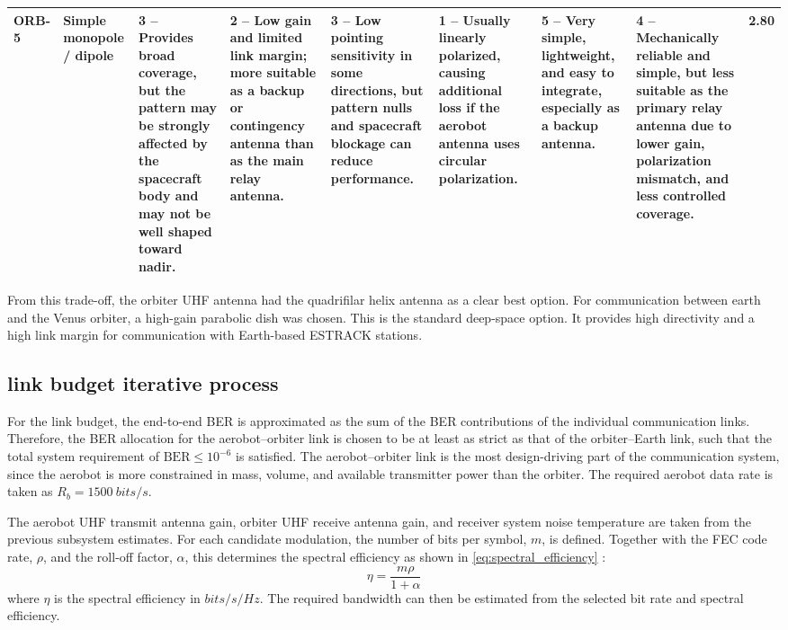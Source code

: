 \begin{table}[H]
{\begin{tabular}{|p{1.2cm}|p{3.0cm}|p{4.0cm}|p{3.5cm}|p{3.8cm}|p{3.7cm}|p{3.5cm}|p{3.8cm}|p{2.0cm}|}
ORB-5 &
\textbf{Simple monopole / dipole} &
\cellcolor{score3!40}\textbf{3} -- Provides broad coverage, but the pattern may be strongly affected by the spacecraft body and may not be well shaped toward nadir. &
\cellcolor{score2!40}\textbf{2} -- Low gain and limited link margin; more suitable as a backup or contingency antenna than as the main relay antenna. &
\cellcolor{score3!40}\textbf{3} -- Low pointing sensitivity in some directions, but pattern nulls and spacecraft blockage can reduce performance. &
\cellcolor{score1!40}\textbf{1} -- Usually linearly polarized, causing additional loss if the aerobot antenna uses circular polarization. &
\cellcolor{score5!40}\textbf{5} -- Very simple, lightweight, and easy to integrate, especially as a backup antenna. &
\cellcolor{score4!40}\textbf{4} -- Mechanically reliable and simple, but less suitable as the primary relay antenna due to lower gain, polarization mismatch, and less controlled coverage. &
\cellcolor{score3!40}\textbf{2.80} \\
\hline

\end{tabular}%
}
\end{table}
From this trade-off, the orbiter UHF antenna had the quadrifilar helix antenna as a clear best option. For communication between earth and the Venus orbiter, a high-gain parabolic dish was chosen. This is the standard deep-space option. It provides high directivity and a high link margin for communication with Earth-based ESTRACK stations.
\subsection{link budget iterative process}
\label{subsec: link budget iterative process}
For the link budget, the end-to-end BER is approximated as the sum of the BER contributions of the individual communication links. Therefore, the BER allocation for the aerobot--orbiter link is chosen to be at least as strict as that of the orbiter--Earth link, such that the total system requirement of $\mathrm{BER} \leq 10^{-6}$ is satisfied. The aerobot--orbiter link is the most design-driving part of the communication system, since the aerobot is more constrained in mass, volume, and available transmitter power than the orbiter. The required aerobot data rate is taken as $R_b = 1500~bits/s$.

The aerobot UHF transmit antenna gain, orbiter UHF receive antenna gain, and receiver system noise temperature are taken from the previous subsystem estimates. For each candidate modulation, the number of bits per symbol, $m$, is defined. Together with the FEC code rate, $\rho$, and the roll-off factor, $\alpha$, this determines the spectral efficiency as shown in \autoref{eq:spectral_efficiency} \cite{wertz1999smad}:
\begin{equation}
    \eta = \frac{m\rho}{1+\alpha}
    \label{eq:spectral_efficiency}
\end{equation}
where $\eta$ is the spectral efficiency in $bits/s/Hz$. The required bandwidth can then be estimated from the selected bit rate and spectral efficiency.

